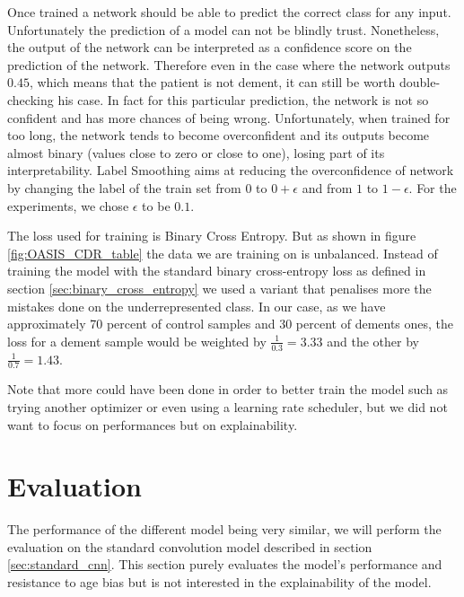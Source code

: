 Once trained a network should be able to predict the correct class for any input. Unfortunately the prediction of a model can not be blindly trust. Nonetheless, the output of the network can be interpreted as a confidence score on the prediction of the network. Therefore even in the case where the network outputs $0.45$, which means that the patient is not dement, it can still be worth double-checking his case. In fact for this particular prediction, the network is not so confident and has more chances of being wrong. Unfortunately, when trained for too long, the network tends to become overconfident and its outputs become almost binary (values close to zero or close to one), losing part of its interpretability. Label Smoothing \cite{label_smoothing_szegedy2015rethinking} aims at reducing the overconfidence of network by changing the label of the train set from $0$ to $0 + \epsilon$ and from $1$ to $1 - \epsilon$. For the experiments, we chose $\epsilon$ to be $0.1$.

The loss used for training is Binary Cross Entropy. But as shown in figure \ref{fig:OASIS_CDR_table} the data we are training on is unbalanced. Instead of training the model with the standard binary cross-entropy loss as defined in section \ref{sec:binary_cross_entropy} we used a variant that penalises more the mistakes done on the underrepresented class. In our case, as we have approximately 70 percent of control samples and 30 percent of dements ones, the loss for a dement sample would be weighted by $\frac{1}{0.3} = 3.33$ and the other by $\frac{1}{0.7} = 1.43$.

Note that more could have been done in order to better train the model such as trying another optimizer or even using a learning rate scheduler, but we did not want to focus on performances but on explainability.

\section{Evaluation}
The performance of the different model being very similar, we will perform the evaluation on the standard convolution model described in section \ref{sec:standard_cnn}. This section purely evaluates the model's performance and resistance to age bias but is not interested in the explainability of the model. 


